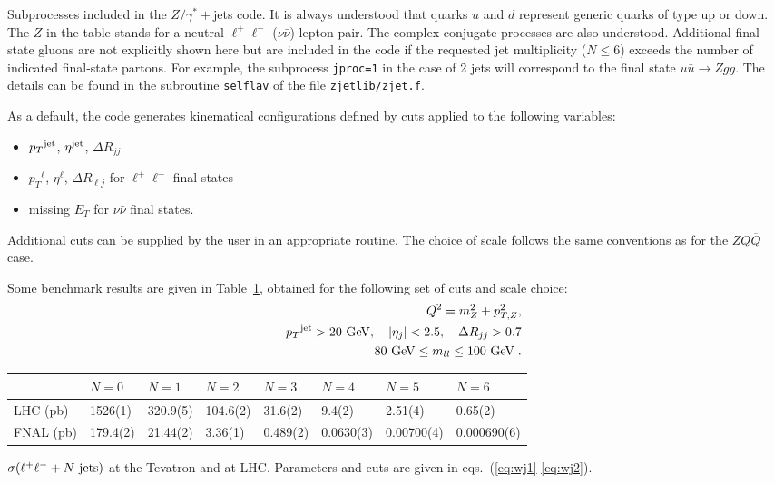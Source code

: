 \documentclass[paper]{JHEP3}
\newcommand{\gev}{\mbox{GeV}}
\newcommand{\ccaption}[2]{
    \begin{center}
    \parbox{0.85\textwidth}{
      \caption[#1]{\small{{#2}}}
      }
    \end{center}
    }
\def    \ba             {\begin{eqnarray}}
\def    \ea             {\end{eqnarray}}
\def    \gev            {\mbox{$\mathrm{GeV}$}}
\def    \ubar   {\bar{u}}
\def    \Qbar   {\overline{Q}}
\def    \mZsq             {\mbox{$m_Z^2$} }
\def    \pt             {\mbox{$p_T$}}
\def    \ptZsq           {\mbox{$p^2_{T,Z}$}}
\begin{document}
\begin{table}[h]
\begin{center}
\ccaption{}{\label{tab:zjets} Subprocesses included in the
  $Z/\gamma^{*}+$jets code.  It is always understood that quarks $u$ and
  $d$ represent generic quarks of type up or down. The $Z$ in the
  table stands for a neutral $\ell^+ \ell^-$ ($\nu \bar\nu$) lepton
  pair.  The complex conjugate processes are also understood.
  Additional final-state gluons are not explicitly shown here but are
  included in the code if the requested jet multiplicity ($N\le 6$)
  exceeds the number of indicated final-state partons.  For example,
  the subprocess {\tt jproc=1} in the case of 2  jets will
  correspond to the final state $u\ubar \to Z  g g$.  The
  details can be found in the subroutine {\tt selflav} of the file
  {\tt zjetlib/zjet.f}.}
\end{center}
\end{table}

As a default, the code generates kinematical configurations defined by
cuts applied to the following variables:
\begin{itemize}
\item $\pt^{\rm jet}$, $\eta^{\rm jet}$, $\Delta R_{jj}$
\item $\pt^{\ell}$, $\eta^{\ell}$, $\Delta R_{\ell j}$ for $\ell^+ \ell^-$ 
final states
\item missing $E_T$ for $\nu \bar\nu$ final states.  
\end{itemize}
Additional cuts can be supplied by the user in an appropriate routine.
The choice of scale follows the same conventions as for the $ZQ\Qbar$
case.

Some benchmark results are given in Table~\ref{tab:zjxs}, obtained
for the following set of cuts and scale choice:
\ba \label{eq:zj1}
&& Q^2 = \mZsq + \ptZsq,
\\
        && \pt^{\rm jet}>20~\gev, \quad \vert \eta_j\vert < 2.5, \quad \Delta
        R_{jj} >0.7
\\
        && 80~\gev \leq m_{ll} \leq 100~\gev \; .
\label{eq:zj2}
\ea

{\renewcommand{\arraystretch}{1.2}
\begin{table}
\begin{center}
\begin{tabular}{||l|l|l|l|l|l|l|l||}\hline
 & $N = 0$  & 
$N = 1$ & $N = 2$ & $N = 3$ & $N = 4$ & $N = 5$ & $N = 6$ \\ 
\hline
LHC (pb)  &  1526(1) &  320.9(5) & 104.6(2) & 31.6(2) & 9.4(2) & 
2.51(4) & 0.65(2) \\ 
\hline
FNAL (pb)  & 179.4(2) & 21.44(2) & 3.36(1) & 0.489(2) & 
0.0630(3) & 0.00700(4)& 0.000690(6) \\ 
\hline
\end{tabular}            
\ccaption{}{\label{tab:zjxs} $\sigma(\ell^+ \ell^- + N~{\rm jets})$
at the Tevatron and at LHC. Parameters and cuts are given
in eqs.~(\ref{eq:wj1}-\ref{eq:wj2}).}
\end{center}
\end{table}}
\end{document}
